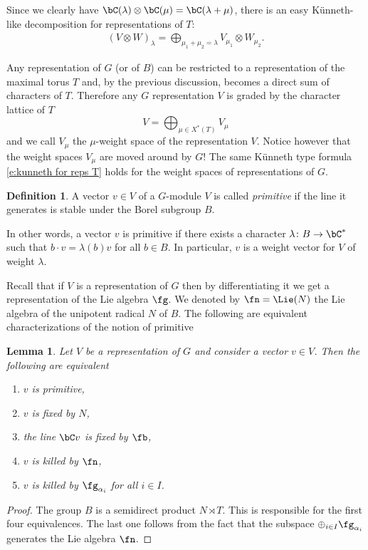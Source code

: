 \documentclass[reqno, 10pt]{amsart}
\theoremstyle{plain}
\newtheorem{lemma}[proposition]{Lemma}
\theoremstyle{definition}
\newtheorem{definition}[proposition]{Definition}
\numberwithin{equation}{section}%
\begin{document}
Since we clearly have $\bC(\lambda)\otimes\bC(\mu) = \bC(\lambda+\mu)$, there is an easy Künneth-like decomposition for representations of $T$:
\begin{align}\label{e:kunneth for reps T}
(V\otimes W)_\lambda = \bigoplus_{\mu_1+\mu_2 = \lambda}V_{\mu_1}\otimes W_{\mu_2}.
\end{align}

Any representation of $G$ (or of $B$) can be restricted to a representation of the maximal torus $T$ and, by the previous discussion, becomes a direct sum of characters of $T$.
Therefore any $G$ representation $V$ is graded by the character lattice of $T$
\[ V = \bigoplus_{\mu\in X^*(T)}V_\mu\]
and we call $V_\mu$ the $\mu$-weight space of the representation $V$.
Notice however that the weight spaces $V_\mu$ are moved around by $G$!
The same Künneth type formula \eqref{e:kunneth for reps T} holds for the weight spaces of representations of $G$.

\medskip
\begin{definition}\label{D:primitive}
	A vector $v\in V$ of a $G$-module $V$ is called {\em primitive} if the line it generates is stable under the Borel subgroup $B$.
\end{definition}
In other words, a vector $v$ is primitive if there exists a character $\lambda\colon B\to \bC^*$ such that $b\cdot v = \lambda(b)v$ for all $b\in B$.
In particular, $v$ is a weight vector for $V$ of weight $\lambda$.

Recall that if $V$ is a representation of $G$ then by differentiating it we get a representation of the Lie algebra $\fg$.
We denoted by $\fn=\Lie(N)$ the Lie algebra of the unipotent radical $N$ of $B$.
The following are equivalent characterizations of the notion of primitive
\begin{lemma}\label{L:equivalent primitive vectors}
	Let $V$ be a representation of $G$ and consider a vector $v\in V$.
	Then the following are equivalent
	\begin{enumerate}
		\item $v$ is primitive,
		\item $v$ is fixed by $N$,
		\item the line $\bC v$ is fixed by $\fb$,
		\item $v$ is killed by $\fn$,
		\item $v$ is killed by $\fg_{\alpha_i}$ for all $i\in I$.
	\end{enumerate}
\end{lemma}
\begin{proof}
	The group $B$ is a semidirect product $N\rtimes T$. This is responsible for the first four equivalences.
	The last one follows from the fact that the subspace $\oplus_{i\in I}\fg_{\alpha_i}$ generates the Lie algebra $\fn$.
\end{proof}
\end{document}
